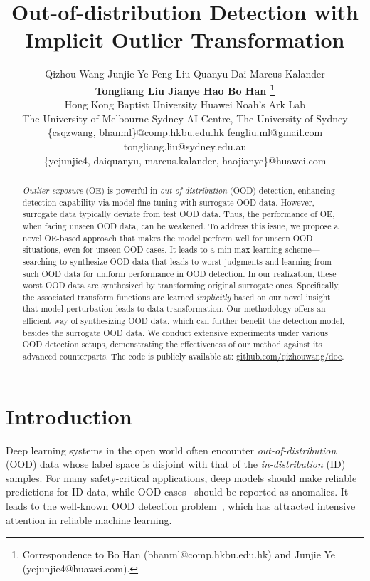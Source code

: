 \documentclass{article} \usepackage{iclr2022_conference,times}
\title{Out-of-distribution Detection with Implicit Outlier Transformation}
\author{Qizhou Wang \quad Junjie Ye \quad Feng Liu \quad Quanyu Dai \quad Marcus Kalander \\ \textbf{Tongliang Liu \quad Jianye Hao \quad Bo Han \thanks{Correspondence to Bo Han (bhanml@comp.hkbu.edu.hk) and Junjie Ye (yejunjie4@huawei.com).}} \\
  Hong Kong Baptist University \quad
  Huawei Noah's Ark Lab \quad \\
  The University of Melbourne \quad
   Sydney AI Centre, The University of Sydney \quad \\
  \textnormal{\{csqzwang, bhanml\}@comp.hkbu.edu.hk} \quad \textnormal{{fengliu.ml}@gmail.com} \quad \textnormal{tongliang.liu@sydney.edu.au}  \\
  \textnormal{\{yejunjie4, daiquanyu, marcus.kalander, haojianye\}@huawei.com} 
}
\begin{document}
\maketitle

\begin{abstract}



\textit{Outlier exposure} (OE) is powerful in \textit{out-of-distribution} (OOD) detection, enhancing detection capability via model fine-tuning with surrogate OOD data. However, surrogate data typically deviate from test OOD data. Thus, the performance of OE, when facing unseen OOD data, can be weakened. To address this issue, we propose a novel OE-based approach that makes the model perform well for unseen OOD situations, even for unseen OOD cases. It leads to a min-max learning scheme---searching to synthesize OOD data that leads to worst judgments and learning from such OOD data for uniform performance in OOD detection. In our realization, these worst OOD data are synthesized by transforming original surrogate ones. Specifically, the associated transform functions are learned \emph{implicitly} based on our novel insight that model perturbation leads to data transformation. Our methodology offers an efficient way of synthesizing OOD data, which can further benefit the detection model, besides the surrogate OOD data. We conduct extensive experiments under various OOD detection setups, demonstrating the effectiveness of our method against its advanced counterparts. The code is publicly available at: \href{https://github.com/QizhouWang/DOE}{{github.com/qizhouwang/doe}}.






\end{abstract}


\section{Introduction}
\label{sec: intro}


Deep learning systems in the open world often encounter \emph{out-of-distribution} (OOD) data whose label space is disjoint with that of the \emph{in-distribution} (ID) samples. For many safety-critical applications, deep models should make reliable predictions for ID data,  while OOD cases~\citep{bulusu2020anomalous} should be reported as anomalies. It leads to the well-known OOD detection problem~\citep{lee2018simple,fang2022out}, which has attracted intensive attention in reliable machine learning. 
\end{document}
